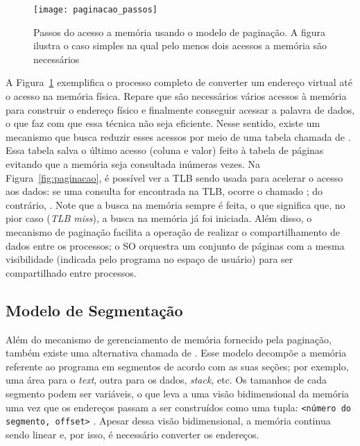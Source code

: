 \begin{figure}[!h]
  \centering
  \texttt{[image: paginacao\_passos]} 
	\caption[Passos do acesso a memória usando o modelo de paginação.]{Passos do acesso a memória usando o modelo de paginação. A figura ilustra o caso simples na qual pelo menos dois acessos a memória são necessários}
  \label{fig:passos_paginacao}
\end{figure}


A Figura~\ref{fig:passos_paginacao} exemplifica o processo completo de
converter um endereço virtual até o acesso na memória física. Repare que são
necessários vários acessos à memória para construir o endereço físico e
finalmente conseguir acessar a palavra de dados, o que faz com que essa técnica
não seja eficiente.  Nesse sentido, existe um mecanismo que busca reduzir esses
acessos por meio de uma tabela chamada de . Essa tabela salva o último acesso (coluna e valor) feito à
tabela de páginas evitando que a memória seja consultada inúmeras vezes. Na
Figura~\ref{fig:paginacao}, é possível ver a TLB sendo usada para acelerar o
acesso aos dados: se uma consulta for encontrada na TLB, ocorre o chamado
; do contrário, . Note que a busca na memória sempre é feita, o que significa
que, no pior caso (\emph{TLB miss}), a busca na memória já foi iniciada. Além
disso, o mecanismo de paginação facilita a operação de realizar o
compartilhamento de dados entre os processos; o SO orquestra um conjunto de
páginas com a mesma visibilidade (indicada pelo programa no espaço de usuário)
para ser compartilhado entre processos.

\subsection{Modelo de Segmentação}
\label{sec:segmentacao}

Além do mecanismo de gerenciamento de memória fornecido pela paginação, também
existe uma alternativa chamada de . Esse modelo
decompõe a memória referente ao programa em segmentos de acordo com as suas
seções; por exemplo, uma área para o \textit{text}, outra para os dados,
\textit{stack}, etc. Os tamanhos de cada segmento podem ser variáveis, o que
leva a uma visão bidimensional da memória uma vez que os endereços passam a ser
construídos como uma tupla: \texttt{<número do segmento, offset>}
\citep{silberschatz}. Apesar dessa visão bidimensional, a memória continua
sendo linear e, por isso, é necessário converter os endereços.

